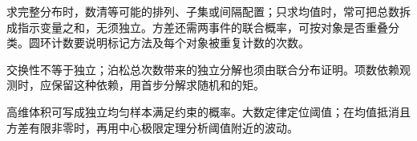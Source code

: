 求完整分布时，数清等可能的排列、子集或间隔配置；只求均值时，常可把总数拆成指示变量之和，无须独立。方差还需两事件的联合概率，可按对象是否重叠分类。圆环计数要说明标记方法及每个对象被重复计数的次数。

交换性不等于独立；泊松总次数带来的独立分解也须由联合分布证明。项数依赖观测时，应保留这种依赖，用首步分解求随机和的矩。

高维体积可写成独立均匀样本满足约束的概率。大数定律定位阈值；在均值抵消且方差有限非零时，再用中心极限定理分析阈值附近的波动。
\par\smallskip
